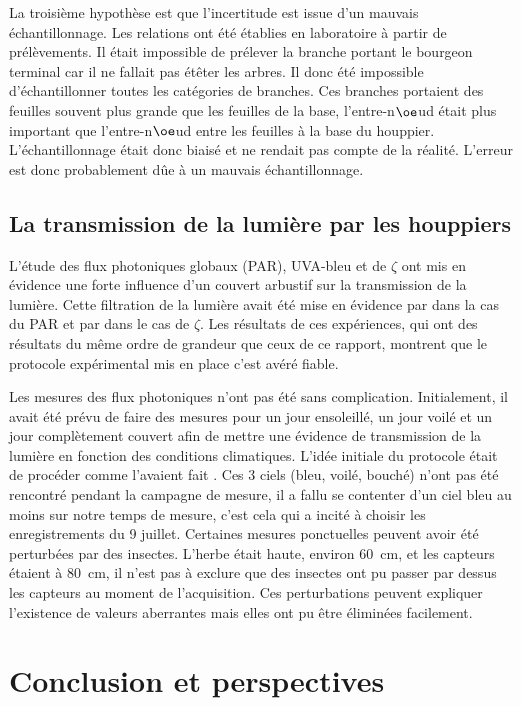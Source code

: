 \documentclass[12pt]{report}
\begin{document}
La troisième hypothèse est que l'incertitude est issue d'un mauvais
échantillonnage. Les relations ont été établies en laboratoire à partir de
prélèvements. Il était impossible de prélever la branche portant le bourgeon
terminal car il ne fallait pas étêter les arbres. Il donc été impossible
d'échantillonner toutes les catégories de branches. Ces branches portaient des
feuilles souvent plus grande que les feuilles de la base, l'entre-n$\oe$ud était
plus important que l'entre-n$\oe$ud entre les feuilles à la base du houppier.
L'échantillonnage était donc biaisé et ne rendait pas compte de la réalité.
L'erreur est donc probablement dûe à un mauvais échantillonnage.


\section{La transmission de la lumière par les houppiers}

L'étude des flux photoniques globaux (PAR), UVA-bleu et de $\zeta$ ont mis en
évidence une forte influence d'un couvert arbustif sur la transmission de la
lumière. Cette filtration de la lumière avait été mise en évidence par
\citet{MAR_ref36} dans la cas du PAR et par \citet{MAR_ref30} dans le cas de
$\zeta$. Les résultats de ces expériences, qui ont des résultats du même ordre
de grandeur que ceux de ce rapport, montrent que le protocole expérimental
mis en place c'est avéré fiable.

Les mesures des flux photoniques n'ont pas été sans complication. Initialement,
il avait été prévu de faire des mesures pour un jour ensoleillé, un jour voilé
et un jour complètement couvert afin de mettre une évidence de transmission de
la lumière en fonction des conditions climatiques. L'idée initiale du protocole
était de procéder comme l'avaient fait \citet{MAR_ref36}. Ces 3 ciels (bleu,
voilé, bouché) n'ont pas été rencontré pendant la campagne de mesure, il a fallu
se contenter d'un ciel bleu au moins sur notre temps de mesure, c'est cela qui a
incité à choisir les enregistrements du 9 juillet. Certaines mesures ponctuelles
peuvent avoir été perturbées par des insectes. L'herbe était haute, environ
60~cm, et les capteurs étaient à 80~cm, il n'est pas à exclure que des insectes
ont pu passer par dessus les capteurs au moment de l'acquisition. Ces
perturbations peuvent expliquer l'existence de valeurs aberrantes mais elles ont
pu être éliminées facilement.


\chapter{Conclusion et perspectives}
\end{document}
